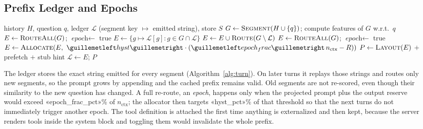 \documentclass[journal]{IEEEtran}
\begin{document}
\subsection{Prefix Ledger and Epochs}
\begin{algorithm}[t]\caption{Per-turn prompt assembly with the prefix ledger}\label{alg:turn}\small
\begin{algorithmic}[1]
\Require history $H$, question $q$, ledger $\mathcal{L}$ (segment key $\mapsto$ emitted string), store $S$
\State $G\gets\textsc{Segment}(H\cup\{q\})$; compute features of $G$ w.r.t.\ $q$
 \State $E\gets\textsc{RouteAll}(G)$; $\textit{epoch}\gets$ true
\Else
  \State $E\gets\{g\mapsto\mathcal{L}[g]: g\in G\cap\mathcal{L}\}$ 
  \State $E\gets E\cup\textsc{Route}(G\setminus\mathcal{L})$
   \State $E\gets\textsc{RouteAll}(G)$; $\textit{epoch}\gets$ true \EndIf
\EndIf
{} \State $E\gets\textsc{Allocate}(E,\ «hyst»\cdot(«epoch_frac»\,n_\text{ctx}-R))$ \EndIf
\State $P\gets\textsc{Layout}(E)$ $+$ prefetch $+$ stub hint 
\State $\mathcal{L}\gets E$; \Return $P$
\end{algorithmic}\end{algorithm}
The ledger stores the exact string emitted for every segment (Algorithm~\ref{alg:turn}). On later turns it replays those strings
and routes only new segments, so the prompt grows by appending and the cached prefix remains valid. Old segments are not re-scored,
even though their similarity to the new question has changed. A full re-route, an \emph{epoch}, happens only when the projected
prompt plus the output reserve would exceed «epoch_frac_pct»\% of $n_\text{ctx}$; the allocator then targets «hyst_pct»\% of that
threshold so that the next turns do not immediately trigger another epoch. The tool definition is attached the first time anything is
externalized and then kept, because the server renders tools inside the system block and toggling them would invalidate the whole
prefix.
\end{document}
